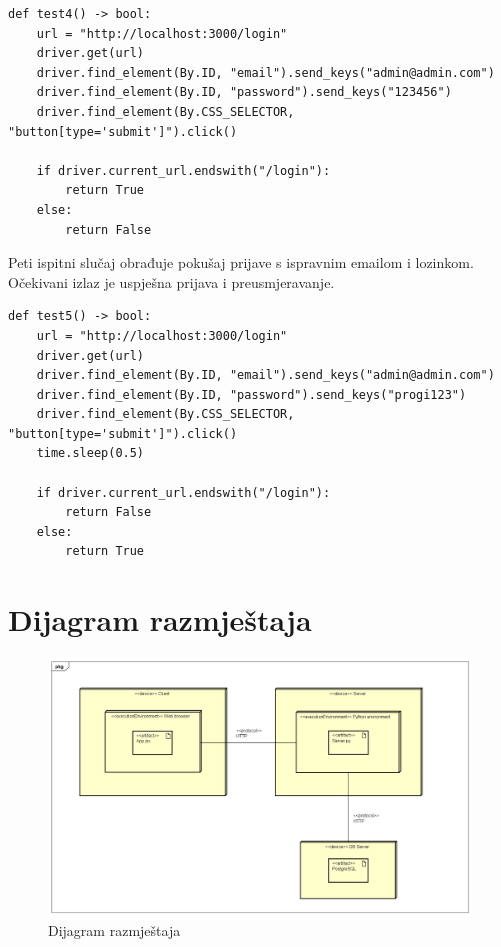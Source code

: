 \lstset{language=Python, xleftmargin=0pt}
\begin{lstlisting}
def test4() -> bool:
    url = "http://localhost:3000/login"
    driver.get(url)
    driver.find_element(By.ID, "email").send_keys("admin@admin.com")
    driver.find_element(By.ID, "password").send_keys("123456")
    driver.find_element(By.CSS_SELECTOR, "button[type='submit']").click()

    if driver.current_url.endswith("/login"):
        return True
    else:
        return False
\end{lstlisting}

Peti ispitni slučaj obrađuje pokušaj prijave s ispravnim emailom i lozinkom. Očekivani izlaz je uspješna prijava i preusmjeravanje. 

\lstset{language=Python, xleftmargin=0pt}
\begin{lstlisting}
def test5() -> bool:
    url = "http://localhost:3000/login"
    driver.get(url)
    driver.find_element(By.ID, "email").send_keys("admin@admin.com")
    driver.find_element(By.ID, "password").send_keys("progi123")
    driver.find_element(By.CSS_SELECTOR, "button[type='submit']").click()
    time.sleep(0.5)

    if driver.current_url.endswith("/login"):
        return False
    else:
        return True
\end{lstlisting}



\eject

		
		\section{Dijagram razmještaja}
			
		\begin{figure}[htp]
			\includegraphics[scale=0.4]{dijagrami/DeploymentDiagram0.png}
			\centering
			\caption{Dijagram razmještaja}
		\end{figure}
		
